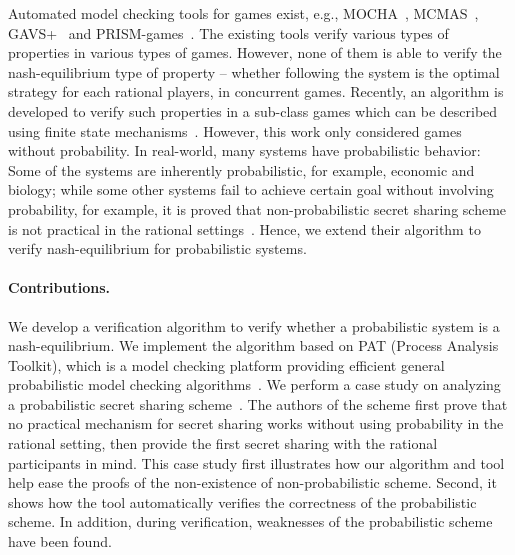 Automated model checking tools for games exist, e.g., MOCHA~\cite{AHM98}, MCMAS~\cite{LQR09}, GAVS+~\cite{CKL11} and PRISM-games~\cite{CFK13}. The existing tools verify various types of properties in various types of games. However, none of them is able to verify the nash-equilibrium type of property -- whether following the system is the optimal strategy for each rational players, in concurrent games. Recently, an algorithm is developed to verify such properties in a sub-class games which can be described using finite state mechanisms~\cite{MMS08}. However, this work only considered games without probability. In real-world, many systems have probabilistic behavior:
Some of the systems are inherently probabilistic, for example, economic and biology; while some other systems fail to achieve certain goal without involving probability, for example, it is proved that non-probabilistic secret sharing scheme is not practical in the rational settings~\cite{HT04}. Hence, we extend their algorithm to verify nash-equilibrium for probabilistic systems. 

\paragraph{Contributions.}
We develop a verification algorithm to verify whether a probabilistic system is a nash-equilibrium. 
We implement the algorithm based on PAT (Process Analysis Toolkit), which is a model checking platform providing efficient general probabilistic model checking algorithms~\cite{PAT}.
We perform a case study on analyzing a probabilistic secret sharing scheme~\cite{HT04}. The authors of the scheme first prove that no practical mechanism for secret sharing works without using probability in the rational setting, then provide the first secret sharing with the rational participants in mind. 
This case study first illustrates how our algorithm and tool help ease the proofs of the non-existence of non-probabilistic scheme. Second, it shows how the tool automatically verifies the correctness of the probabilistic scheme. In addition, during verification, weaknesses of the probabilistic scheme have been found.